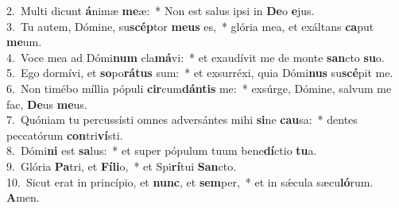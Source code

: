 {2.~}Multi dicunt \textbf{á}nimæ \textbf{me}æ:~* Non est salus ipsi in \textbf{De}o \textbf{e}jus.\\
{3.~}Tu autem, Dómine, su\textbf{scép}tor \textbf{me}\textbf{us} es,~* glória mea, et exáltans \textbf{ca}put \textbf{me}um.\\
{4.~}Voce mea ad Dómi\textbf{num} cla\textbf{má}vi:~* et exaudívit me de monte \textbf{san}cto \textbf{su}o.\\
{5.~}Ego dormívi, et \textbf{so}po\textbf{rá}\textbf{tus} sum:~* et exsurréxi, quia Dómi\textbf{nus} su\textbf{scé}pit me.\\
{6.~}Non timébo míllia pópuli \textbf{cir}cum\textbf{dán}\textbf{tis} me:~* exsúrge, Dómine, salvum me fac, \textbf{De}us \textbf{me}us.\\
{7.~}Quóniam tu percussísti omnes adversántes mihi \textbf{si}ne \textbf{cau}sa:~* dentes peccatórum \textbf{con}tri\textbf{ví}sti.\\
{8.~}Dómi\textbf{ni} est \textbf{sa}lus:~* et super pópulum tuum bene\textbf{dí}ctio \textbf{tu}a.\\
{9.~}Glória \textbf{Pa}tri, et \textbf{Fí}\textbf{li}o,~* et Spi\textbf{rí}tui \textbf{San}cto.\\
{10.~}Sicut erat in princípio, et \textbf{nunc}, et \textbf{sem}per,~* et in sǽcula sæcu\textbf{ló}rum. \textbf{A}men.\\
